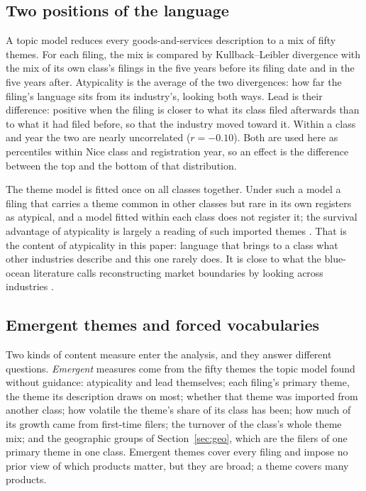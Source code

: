 \subsection{Two positions of the language}

A topic model reduces every goods-and-services description to a mix of
fifty themes. For each filing, the mix is compared by Kullback--Leibler
divergence with the mix of its own class's filings in the five years
before its filing date and in the five years after. Atypicality is the
average of the two divergences: how far the filing's language sits from
its industry's, looking both ways. Lead is their difference: positive
when the filing is closer to what its class filed afterwards than to
what it had filed before, so that the industry moved toward it. Within a
class and year the two are nearly uncorrelated ($r = -0.10$). Both are
used here as percentiles within Nice class and registration year, so an
effect is the difference between the top and the bottom of that
distribution.

The theme model is fitted once on all classes together. Under such a
model a filing that carries a theme common in other classes but rare in
its own registers as atypical, and a model fitted within each class does
not register it; the survival advantage of atypicality is largely a
reading of such imported themes \citep{SilverCorpus2026}. That is the
content of atypicality in this paper: language that brings to a class
what other industries describe and this one rarely does. It is close to
what the blue-ocean literature calls reconstructing market boundaries by
looking across industries \citep{KimMauborgne2004}.

\subsection{Emergent themes and forced vocabularies}\label{sec:themes}

Two kinds of content measure enter the analysis, and they answer
different questions. \emph{Emergent} measures come from the fifty themes
the topic model found without guidance: atypicality and lead
themselves; each filing's primary theme, the theme its description
draws on most; whether that theme was imported from another class;
how volatile the theme's share of its class has been; how much of its
growth came from first-time filers; the turnover of the class's whole
theme mix; and the geographic groups of Section~\ref{sec:geo}, which
are the filers of one primary theme in one class. Emergent themes cover
every filing and impose no prior view of which products matter, but they
are broad; a theme covers many products.

